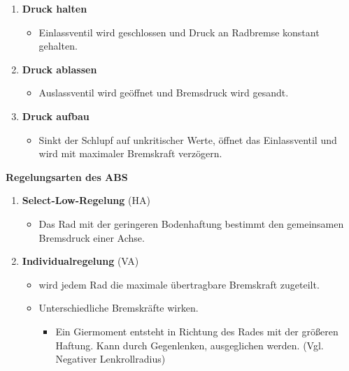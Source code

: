 \begin{enumerate}
\item
  \textbf{Druck halten}

  \begin{itemize}
  \item
    Einlassventil wird geschlossen und Druck an Radbremse konstant
    gehalten.
  \end{itemize}
\item
  \textbf{Druck ablassen}

  \begin{itemize}
  \item
    Auslassventil wird geöffnet und Bremsdruck wird gesandt.
  \end{itemize}
\item
  \textbf{Druck aufbau}

  \begin{itemize}
  \item
    Sinkt der Schlupf auf unkritischer Werte, öffnet das Einlassventil
    und wird mit maximaler Bremskraft verzögern.
  \end{itemize}
\end{enumerate}

\textbf{Regelungsarten des ABS}

\begin{enumerate}
\item
  \textbf{Select-Low-Regelung} (HA)

  \begin{itemize}
  \item
    Das Rad mit der geringeren Bodenhaftung bestimmt den gemeinsamen
    Bremsdruck einer Achse.
  \end{itemize}
\item
  \textbf{Individualregelung} (VA)

  \begin{itemize}
  \item
    wird jedem Rad die maximale übertragbare Bremskraft zugeteilt.
  \item
    Unterschiedliche Bremskräfte wirken.

    \begin{itemize}
    \item
      Ein Giermoment entsteht in Richtung des Rades mit der größeren
      Haftung. Kann durch Gegenlenken, ausgeglichen werden. (Vgl.
      Negativer Lenkrollradius)
    \end{itemize}
  \end{itemize}
\end{enumerate}


